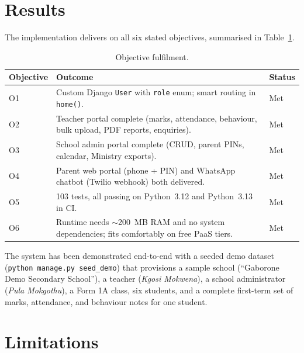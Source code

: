 \documentclass[11pt,a4paper]{article}
\begin{document}
\section{Results}

The implementation delivers on all six stated objectives, summarised in
Table~\ref{tab:results}.

\begin{table}[h]
\centering
\caption{Objective fulfilment.}
\label{tab:results}
\renewcommand{\arraystretch}{1.25}
\begin{tabular}{p{2cm} p{11cm} p{1.5cm}}
\toprule
\textbf{Objective} & \textbf{Outcome} & \textbf{Status} \\
\midrule
O1 & Custom Django \texttt{User} with \texttt{role} enum; smart routing in \texttt{home()}. & Met \\
O2 & Teacher portal complete (marks, attendance, behaviour, bulk upload, PDF reports, enquiries). & Met \\
O3 & School admin portal complete (CRUD, parent PINs, calendar, Ministry exports). & Met \\
O4 & Parent web portal (phone + PIN) and WhatsApp chatbot (Twilio webhook) both delivered. & Met \\
O5 & 103 tests, all passing on Python~3.12 and Python~3.13 in CI. & Met \\
O6 & Runtime needs $\sim$200~MB RAM and no system dependencies; fits comfortably on free PaaS tiers. & Met \\
\bottomrule
\end{tabular}
\end{table}

The system has been demonstrated end-to-end with a seeded demo dataset
(\texttt{python manage.py seed\_demo}) that provisions a sample school
(``Gaborone Demo Secondary School''), a teacher (\textit{Kgosi Mokwena}), a
school administrator (\textit{Pula Mokgothu}), a Form 1A class, six
students, and a complete first-term set of marks, attendance, and behaviour
notes for one student.

\section{Limitations}
\end{document}
